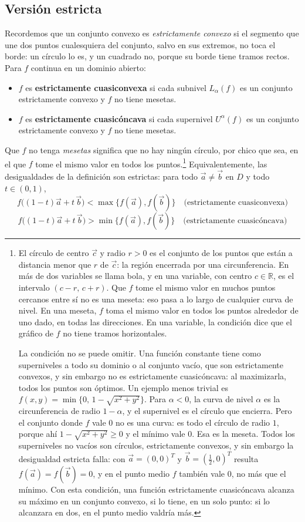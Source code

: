 \documentclass{article}
\newcommand{\R}{\ensuremath{\mathbb{R}}}
\newcommand{\vect}[1]{\vec{#1}}
\begin{document}
\subsection*{Versión estricta}

Recordemos que un conjunto convexo es \emph{estrictamente convexo} si el segmento que une dos puntos cualesquiera del conjunto, salvo en sus extremos, no toca el borde: un círculo lo es, y un cuadrado no, porque su borde tiene tramos rectos. Para \(f\) continua en un dominio abierto:
\begin{itemize}
  \item {\color{teal}\(f\) es \textbf{estrictamente cuasiconvexa} si cada subnivel \(L_\alpha(f)\) es un conjunto estrictamente convexo y \(f\) no tiene mesetas.}
  \item {\color{teal}\(f\) es \textbf{estrictamente cuasicóncava} si cada supernivel \(U^\alpha(f)\) es un conjunto estrictamente convexo y \(f\) no tiene mesetas.}
\end{itemize}
Que \(f\) no tenga \emph{mesetas} significa que no hay ningún círculo, por chico que sea, en el que \(f\) tome el mismo valor en todos los puntos.\footnote{El círculo de centro \(\vect{c}\) y radio \(r>0\) es el conjunto de los puntos que están a distancia menor que \(r\) de \(\vect{c}\): la región encerrada por una circunferencia. En más de dos variables se llama bola, y en una variable, con centro \(c\in\R\), es el intervalo \((c-r,\,c+r)\). Que \(f\) tome el mismo valor en muchos puntos cercanos entre sí no es una meseta: eso pasa a lo largo de cualquier curva de nivel. En una meseta, \(f\) toma el mismo valor en todos los puntos alrededor de uno dado, en todas las direcciones. En una variable, la condición dice que el gráfico de \(f\) no tiene tramos horizontales.

La condición no se puede omitir. Una función constante tiene como superniveles a todo su dominio o al conjunto vacío, que son estrictamente convexos, y sin embargo no es estrictamente cuasicóncava: al maximizarla, todos los puntos son óptimos. Un ejemplo menos trivial es \(f(x,y)=\min\{0,\,1-\sqrt{x^2+y^2}\}\). Para \(\alpha<0\), la curva de nivel \(\alpha\) es la circunferencia de radio \(1-\alpha\), y el supernivel es el círculo que encierra. Pero el conjunto donde \(f\) vale \(0\) no es una curva: es todo el círculo de radio \(1\), porque ahí \(1-\sqrt{x^2+y^2}\ge0\) y el mínimo vale \(0\). Esa es la meseta. Todos los superniveles no vacíos son círculos, estrictamente convexos, y sin embargo la desigualdad estricta falla: con \(\vect{a}=(0,0)^T\) y \(\vect{b}=(\tfrac12,0)^T\) resulta \(f(\vect{a})=f(\vect{b})=0\), y en el punto medio \(f\) también vale \(0\), no más que el mínimo. Con esta condición, una función estrictamente cuasicóncava alcanza su máximo en un conjunto convexo, si lo tiene, en un solo punto: si lo alcanzara en dos, en el punto medio valdría más.} Equivalentemente, las desigualdades de la definición son estrictas: para todo \(\vect{a}\neq\vect{b}\) en \(D\) y todo \(t\in(0,1)\),
\[
f\bigl((1-t)\vect{a}+t\,\vect{b}\bigr)<\max\{f(\vect{a}),f(\vect{b})\}
\quad\text{(estrictamente cuasiconvexa)}
\]
\[
f\bigl((1-t)\vect{a}+t\,\vect{b}\bigr)>\min\{f(\vect{a}),f(\vect{b})\}
\quad\text{(estrictamente cuasicóncava)}
\]
\end{document}
